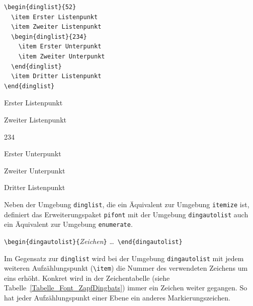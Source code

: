 \documentclass[a4paper,10pt,twoside]{scrbook}
\begin{document}
\begin{minipage}[h]{0.5\textwidth}
\setlength{\parskip}{1em}
\frenchspacing
\begin{Verbatim}[frame=single]
\begin{dinglist}{52}
  \item Erster Listenpunkt
  \item Zweiter Listenpunkt
  \begin{dinglist}{234}
    \item Erster Unterpunkt
    \item Zweiter Unterpunkt
  \end{dinglist}
  \item Dritter Listenpunkt
\end{dinglist}
\end{Verbatim}
\end{minipage}
\hfill
\begin{minipage}[h]{0.48\textwidth}
\setlength{\parskip}{1em}
\frenchspacing
\begin{dinglist}{52}
  \item Erster Listenpunkt
  \item Zweiter Listenpunkt
  \begin{dinglist}{234}
    \item Erster Unterpunkt
    \item Zweiter Unterpunkt
  \end{dinglist}
  \item Dritter Listenpunkt
\end{dinglist}
\end{minipage}

Neben der Umgebung \verb!dinglist!, die ein Äquivalent zur Umgebung \verb!itemize! ist, definiert
das Erweiterungspaket \verb!pifont! mit der Umgebung \verb!dingautolist! auch ein Äquivalent zur 
Umgebung \verb!enumerate!.



\begin{boxedminipage}{\textwidth}
\texttt{\textbackslash begin\{dingautolist\}\{}\textsl{Zeichen}\texttt{\}}  \enskip \dots\ \enskip \texttt{\textbackslash end\{dingautolist\}} 
\end{boxedminipage}


Im Gegensatz zur \verb!dinglist! wird bei der Umgebung \verb!dingautolist!
mit jedem weiteren Aufzählungspunkt 
(\verb!\item!) die Nummer des verwendeten Zeichens um eins erhöht. 
Konkret wird in der Zeichentabelle (siehe Tabelle~\ref{Tabelle_Font_ZapfDingbats}) 
immer ein Zeichen weiter gegangen. So hat jeder Aufzählungspunkt einer Ebene ein anderes
Markierungszeichen.
\end{document}
